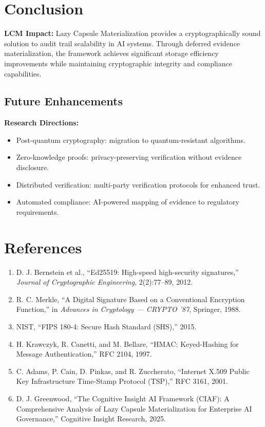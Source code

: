 \documentclass[12pt,a4paper]{article}
\begin{document}
\section{Conclusion}

\begin{executivebox}
\textbf{LCM Impact:} Lazy Capsule Materialization provides a cryptographically sound solution to audit trail scalability in AI systems. Through deferred evidence materialization, the framework achieves significant storage efficiency improvements while maintaining cryptographic integrity and compliance capabilities.
\end{executivebox}

\subsection{Future Enhancements}

\begin{valuebox}
\textbf{Research Directions:}
\begin{itemize}[leftmargin=*]
\item Post-quantum cryptography: migration to quantum-resistant algorithms.
\item Zero-knowledge proofs: privacy-preserving verification without evidence disclosure.
\item Distributed verification: multi-party verification protocols for enhanced trust.
\item Automated compliance: AI-powered mapping of evidence to regulatory requirements.
\end{itemize}
\end{valuebox}

\section*{References}

\begin{enumerate}[leftmargin=*]
\item D. J. Bernstein et al., ``Ed25519: High-speed high-security signatures,'' \emph{Journal of Cryptographic Engineering}, 2(2):77--89, 2012.
\item R. C. Merkle, ``A Digital Signature Based on a Conventional Encryption Function,'' in \emph{Advances in Cryptology --- CRYPTO '87}, Springer, 1988.
\item NIST, ``FIPS 180-4: Secure Hash Standard (SHS),'' 2015.
\item H. Krawczyk, R. Canetti, and M. Bellare, ``HMAC: Keyed-Hashing for Message Authentication,'' RFC 2104, 1997.
\item C. Adams, P. Cain, D. Pinkas, and R. Zuccherato, ``Internet X.509 Public Key Infrastructure Time-Stamp Protocol (TSP),'' RFC 3161, 2001.
\item D. J. Greenwood, ``The Cognitive Insight AI Framework (CIAF): A Comprehensive Analysis of Lazy Capsule Materialization for Enterprise AI Governance,'' Cognitive Insight Research, 2025.
\end{enumerate}
\end{document}

